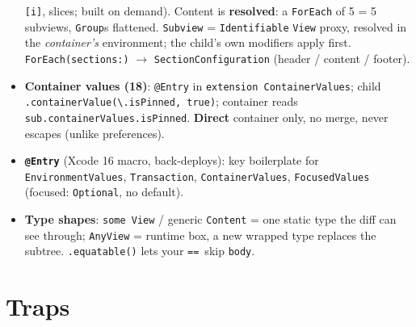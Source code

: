 \documentclass[8pt]{extarticle}
\newcommand\eqeq{\texttt{\hbox{=}\hbox{=}}}
\begin{document}
\begin{multicols}{2}
\begin{itemize}
        \texttt{[i]}, slices; built on demand). Content is \textbf{resolved}: a \texttt{ForEach} of 5 = 5
        subviews, \texttt{Group}s flattened. \texttt{Subview} = \texttt{Identifiable} \texttt{View} proxy,
        resolved in the \emph{container's} environment; the child's own modifiers apply first.
        \texttt{ForEach(sections:)} $\to$ \texttt{SectionConfiguration} (header / content / footer).
  \item \textbf{Container values (18)}: \texttt{@Entry} in \texttt{extension ContainerValues}; child
        \texttt{.containerValue(\textbackslash.isPinned, true)}; container reads
        \texttt{sub.containerValues.isPinned}. \textbf{Direct} container only, no merge, never escapes
        (unlike preferences).
  \item \textbf{\texttt{@Entry}} (Xcode 16 macro, back-deploys): key boilerplate for
        \texttt{EnvironmentValues}, \texttt{Transaction}, \texttt{ContainerValues}, \texttt{FocusedValues}
        (focused: \texttt{Optional}, no default).
  \item \textbf{Type shapes}: \texttt{some View} / generic \texttt{Content} = one static type the diff can
        see through; \texttt{AnyView} = runtime box, a new wrapped type replaces the subtree.
        \texttt{.equatable()} lets your \eqeq\ skip \texttt{body}.
\end{itemize}

\section{Traps}
\begin{itemize}
\end{itemize}


\end{multicols}
\end{document}
